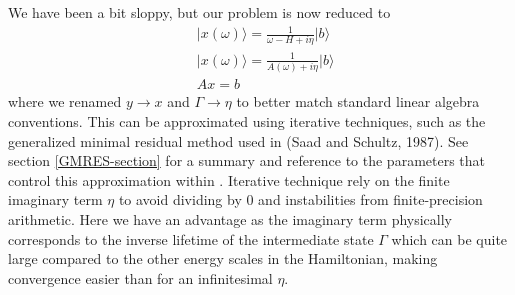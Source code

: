 \documentclass[11pt]{report}
\begin{document}
We have been a bit sloppy, but our problem is now reduced to 
\begin{align}
&\vert x(\omega) \rangle = \frac{1}{\omega - H + i\eta} \vert b \rangle \nonumber \\
&\vert x(\omega) \rangle = \frac{1}{A(\omega) + i\eta} \vert b \rangle \nonumber \\
&Ax = b \nonumber
\end{align}
where we renamed $y\rightarrow x$ and $\Gamma \rightarrow \eta$ to better match standard linear algebra conventions. 
This can be approximated using iterative techniques, such as the generalized minimal residual method used in  (Saad and Schultz, 1987). 
See section \ref{GMRES-section} for a summary and reference to the parameters that control this approximation within .
Iterative technique rely on the finite imaginary term $\eta$ to avoid dividing by 0 and instabilities from finite-precision arithmetic. 
Here we have an advantage as the imaginary term physically corresponds to the inverse lifetime of the intermediate state $\Gamma$ which can be quite large compared to the other energy scales in the Hamiltonian, making convergence easier than for an infinitesimal $\eta$.
\end{document}
